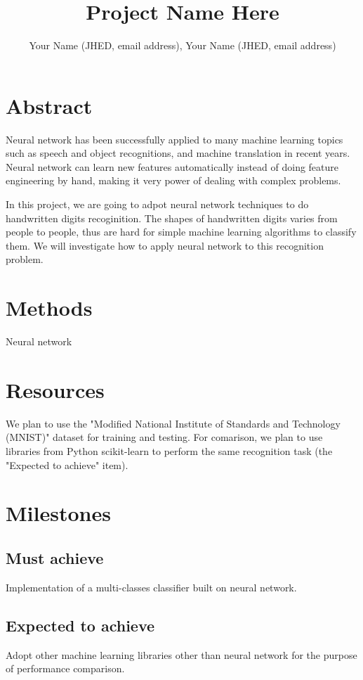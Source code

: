 \documentclass[11pt]{article}
\title{Project Name Here}
\author{Your Name (JHED, email address), Your Name (JHED, email address)}
\date{}
\begin{document}
\maketitle

\section{Abstract}
Neural network has been successfully applied to many machine learning topics such as speech and object recognitions, and machine translation in recent years. Neural network can learn new features automatically instead of doing feature engineering by hand, making it very power of dealing with complex problems. 

In this project, we are going to adpot neural network techniques to do handwritten digits recoginition. The shapes of handwritten digits varies from people to people, thus are hard for simple machine learning algorithms to classify them. We will investigate how to apply neural network to this recognition problem.

\section{Methods}
Neural network

\section{Resources}
We plan to use the "Modified National Institute of Standards and Technology (MNIST)" dataset for training and testing. For comarison, we plan to use libraries from Python scikit-learn to perform the same recognition task (the "Expected to achieve" item).

\section{Milestones}
\subsection{Must achieve}
Implementation of a multi-classes classifier built on neural network.

\subsection{Expected to achieve}
Adopt other machine learning libraries other than neural network for the purpose of performance comparison.
\end{document}
